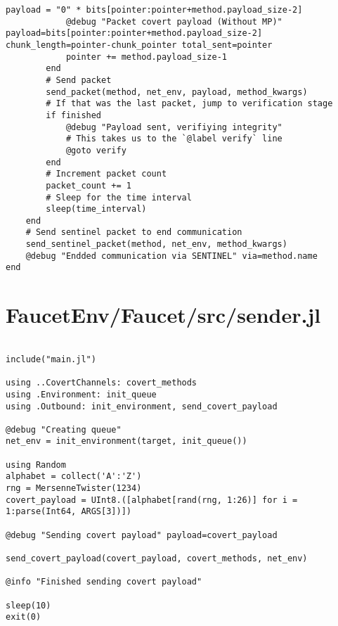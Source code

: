 \begin{lstlisting}[language=JuliaLocal, style=julia]
            payload = "0" * bits[pointer:pointer+method.payload_size-2]
            @debug "Packet covert payload (Without MP)" payload=bits[pointer:pointer+method.payload_size-2] chunk_length=pointer-chunk_pointer total_sent=pointer
            pointer += method.payload_size-1
        end
        # Send packet
        send_packet(method, net_env, payload, method_kwargs)
        # If that was the last packet, jump to verification stage
        if finished
            @debug "Payload sent, verifiying integrity"
            # This takes us to the `@label verify` line
            @goto verify
        end
        # Increment packet count
        packet_count += 1
        # Sleep for the time interval
        sleep(time_interval)
    end
    # Send sentinel packet to end communication
    send_sentinel_packet(method, net_env, method_kwargs)
    @debug "Endded communication via SENTINEL" via=method.name
end

\end{lstlisting}
\section{FaucetEnv/Faucet/src/sender.jl}
\begin{lstlisting}[language=JuliaLocal, style=julia]

include("main.jl")

using ..CovertChannels: covert_methods
using .Environment: init_queue
using .Outbound: init_environment, send_covert_payload

@debug "Creating queue"
net_env = init_environment(target, init_queue())

using Random
alphabet = collect('A':'Z')
rng = MersenneTwister(1234)
covert_payload = UInt8.([alphabet[rand(rng, 1:26)] for i = 1:parse(Int64, ARGS[3])])

@debug "Sending covert payload" payload=covert_payload

send_covert_payload(covert_payload, covert_methods, net_env)

@info "Finished sending covert payload"

sleep(10)
exit(0)

\end{lstlisting}
